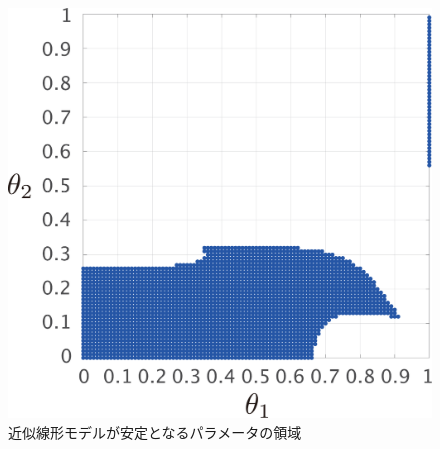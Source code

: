 \documentclass[tombow,dvipdfmx]{corona-a5-1.1}
\begin{document}
\begin{figure}[t]
{\begin{minipage}{0.32\linewidth}
  \end{minipage}
  \begin{minipage}{0.32\linewidth}
    \centering
    \includegraphics[width = .85\linewidth]{figs/gam5}
  \end{minipage}
  \caption{近似線形モデルが安定となるパラメータの領域}
  \label{fig:gamsta}
  }
\end{figure}
\end{document}
